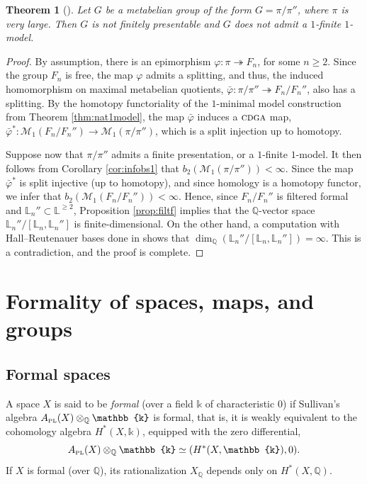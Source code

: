 \documentclass{article}
\numberwithin{equation}{section}
\newtheorem{theorem}{Theorem}[section]
\theoremstyle{definition}
\newcommand{\Q}{\mathbb{Q}}
\renewcommand{\L}{\mathbb{L}}
\renewcommand{\k}{\mathbb{k}}
\newcommand{\M}{\mathcal{M}}
\newcommand{\cdga}{\ensuremath{\textsc{cdga}}}
\newcommand{\surj}{\twoheadrightarrow}
\newcommand{\apl}{A_{\scriptscriptstyle{{\rm PL}}}}
\begin{document}
\begin{theorem}[\cite{PS-jlms}]
\label{thm:meta}
Let $G$ be a metabelian group of the form $G=\pi/\pi''$, where  
$\pi$ is very large.  Then $G$ is not finitely presentable and $G$ 
does not admit a $1$-finite $1$-model.
\end{theorem}

\begin{proof}
By assumption, there is an  
epimorphism $\varphi\colon \pi\surj F_n$, for some $n\ge 2$.  
Since the group $F_n$ is free, the map $\varphi$ admits a 
splitting, and thus, the induced homomorphism on maximal 
metabelian quotients, $\bar\varphi\colon \pi/\pi'' \surj F_n/F_n''$, 
also has a splitting.  By the homotopy functoriality 
of the $1$-minimal model construction from Theorem \ref{thm:nat1model}, 
the map $\bar\varphi$ induces a $\cdga$ map, 
$\bar\varphi^*\colon \M_1(F_n/F_n'') \to \M_1(\pi/\pi'')$, 
which is a split injection up to homotopy.

Suppose now that $\pi/\pi''$ admits a finite presentation, or 
a $1$-finite $1$-model. It then follows from Corollary \ref{cor:infobs1} 
that $b_2(\M_1(\pi/\pi''))< \infty$.  Since the map 
$\bar\varphi^*$ is split injective (up to homotopy), 
and since homology is a homotopy functor, we 
infer that $b_2(\M_1(F_n/F_n''))< \infty$. 
Hence, since $F_n/F_n''$ is filtered formal 
and $\L_n'' \subset \L^{\ge 2}$,  
Proposition \ref{prop:filtf} implies that the $\Q$-vector 
space $\L_n''/[\L_n, \L_n'']$ is finite-dimensional. 
On the other hand, a computation with Hall--Reutenauer 
bases done in \cite[Proposition 3.2]{PS-jlms} shows that 
$\dim_{\Q} ( \L_n''/[\L_n, \L_n''] ) =\infty$. This is a contradiction, 
and the proof is complete.
\end{proof}

\section{Formality of spaces, maps, and groups}
\label{sect:formal}

\subsection{Formal spaces}
\label{subsec:formal-spaces}

A space $X$ is said to be {\em formal}\/ (over a field $\k$ 
of characteristic $0$) if Sullivan's algebra $\apl(X)\otimes_{\Q} \k$ is formal, 
that is, it is weakly equivalent to the cohomology algebra $H^{*}(X,\k)$, 
equipped with the zero differential,
\begin{equation}
\label{eq:formal-space}
\apl(X)\otimes_{\Q} \k \simeq (H^{*}(X,\k),0).
\end{equation}
If $X$ is formal (over $\Q$), its rationalization $X_{\Q}$ depends only on 
$H^{*}(X,\Q)$.
\end{document}
